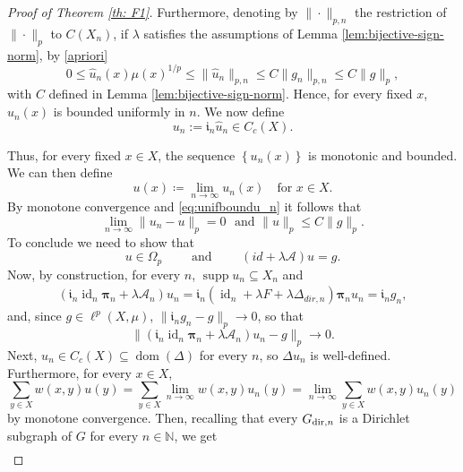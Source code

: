 \documentclass[journal]{article}
\theoremstyle{nonitalic}
\theoremstyle{nonitalic}
\theoremstyle{plain} %
\numberwithin{equation}{section}
\newcommand{\N}{\mathbb{N}}
\newcommand{\dom}{\operatorname{dom}}
\begin{document}
\begin{proof}[Proof of Theorem \ref{th: F1}]
 
Furthermore, denoting by $\|\cdot \|_{p,n}$ the restriction of $\|\cdot\|_p$ to $C(X_n)$, if $\lambda$ satisfies the assumptions of Lemma \ref{lem:bijective-sign-norm},  by \eqref{apriori} 
\begin{equation}\label{eq:unifboundu_n}
0\leq  \hat{u}_{n}(x) \mu(x)^{1/p}\leq 
\|\hat{u}_n\|_{p,n} \leq C\|g_n\|_{p,n} \leq C\|g\|_p,
\end{equation}
with $C$  defined in Lemma \ref{lem:bijective-sign-norm}. Hence, for every fixed $x$, $\hat{u}_{n}(x)$ is bounded uniformly in $n$. We now define $$u_n:= {\mathfrak{i}}_{n}\hat{u}_{n}\in C_c(X).$$

Thus, for every fixed $x \in X$, the sequence $\left\{  u_{n}(x)\right\}$ is monotonic and bounded. We can then define   
$$
u(x) \coloneqq \lim_{n\to \infty}  u_{n}(x) \quad \mbox{for } x\in X\label{eq:limit1}.  
$$
By monotone convergence and \eqref{eq:unifboundu_n} it follows that 
\[
\lim_{n\rightarrow{\infty}}\|u_n-u\|_p=0 \,\,\text{ and } 
\|u\|_p\leq C\|g\|_p.
\]
To conclude we need to show that
\begin{equation}
\label{u-prop-2}
 u\in  \Omega_p \qquad \text{ and } \qquad   (id+\lambda \mathcal{A})u=g.
\end{equation}
Now, by construction, for every $n$, $\operatorname{supp}u_n\subseteq X_n$ and  
\begin{align*}
(\boldsymbol{\mathfrak{i}}_{n}\operatorname{id}_n\boldsymbol{\pi}_{n}   + \lambda \mathcal A_n)     u_n =  \boldsymbol{\mathfrak{i}}_{n}(\operatorname{id}_n+\lambda F+\lambda \Delta_{dir,n} ) \boldsymbol{\pi}_n u_{n}=
	   \boldsymbol{\mathfrak{i}}_{n}  g_n,
\end{align*}
and, since $g\in \ell^p(X,\mu)$, $\|\mathfrak{i}_{n} g_n- g\|_p\to 0$, so that
\[
\|(\boldsymbol{\mathfrak{i}}_{n}\operatorname{id}_n\boldsymbol{\pi}_{n}   + \lambda \mathcal A_n)     u_n - g\|_p\to 0.
\]
Next,  $u_n \in C_c(X) \subseteq \dom\left(\Delta\right)$ for every $n$, so $\Delta u_{n}$ is well-defined. Furthermore, for every $x \in X$,
\begin{equation}\label{Monotone/Dominate_convergence}
  \sum_{y\in X}w(x,y) u(y)=
\sum_{y\in X} \lim_{n\to \infty}w(x,y) u_{n}(y)= \lim_{n\to \infty}\sum_{y\in X}w(x,y) u_{n}(y)  
\end{equation}
by monotone convergence. Then, recalling that every $G_{\textnormal{dir},n}$ is a Dirichlet subgraph of $G$ for every $n\in \N$, we get 
$$
\begin{aligned}

\end{aligned}$$
\end{proof}
\end{document}

